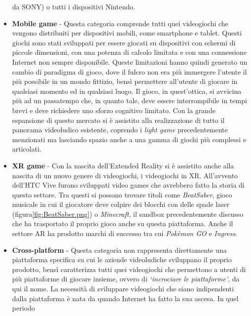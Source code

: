 \begin{itemize}
                    da SONY) o tutti i dispositivi Nintendo. 
                \item \textbf{Mobile game} - Questa categoria comprende tutti quei videogiochi che vengono distribuiti per dispositivi mobili, come smartphone e tablet. Questi giochi
                    sono stati sviluppati per essere giocati su dispositivi con schermi di piccole dimensioni, con una potenza di calcolo limitata e con una connessione Internet
                    non sempre disponibile. Queste limitazioni hanno quindi generato un cambio di paradigma di gioco, dove il fulcro non era più immergere l'utente il più possibile
                    in un mondo fittizio, bensì permettere all'utente di giocare in qualsiasi momento ed in qualsiasi luogo. Il gioco, in quest'ottica, si avvicina più ad un passatempo
                    che, in quanto tale, deve essere interrompibile in tempi brevi e deve richiedere uno sforzo cognitivo limitato. Con la grande espansione di questo mercato si è
                    assistito alla realizzazione di tutto il panorama videoludico esistente, coprendo i \textit{light game} precedentemente menzionati ma lasciando spazio anche a
                    una gamma di giochi più complessi e articolati.
                \item \textbf{XR game} - Con la nascita dell'Extended Reality si è assistito anche alla nascita di un nuovo genere di videogiochi, i videogiochi in XR. All'avvento
                    dell'HTC Vive furono sviluppati video games che avrebbero fatto la storia di questo settore. Tra questi si possono trovare titoli come \textit{BeatSaber}, gioco
                    musicale in cui il giocatore deve colpire dei blocchi con delle spade laser (figura\ref{fig:BeatSaber.png}) o \textit{Minecraft}, il sandbox precedentemente 
                    discusso che ha trasportato il proprio gioco anche su questa piattaforma. Anche il settore AR ha prodotto marchi di successo tra cui \textit{Pokèmon GO} e 
                    \textit{Ingress}.
                \item \textbf{Cross-platform} - Questa categoria non rappresenta direttamente una piattaforma specifica su cui le aziende videoludiche sviluppano il proprio prodotto,
                    bensì caratterizza tutti quei videogiochi che permettono a utenti di più piattaforme di giocare insieme, ovvero di \textit{`incrociare le piattaforme'}, da qui
                    il nome. La necessità di sviluppare videogiochi che siano indipendenti dalla piattaforma è nata da quando Internet ha fatto la sua ascesa. In quel periodo

\end{itemize}
